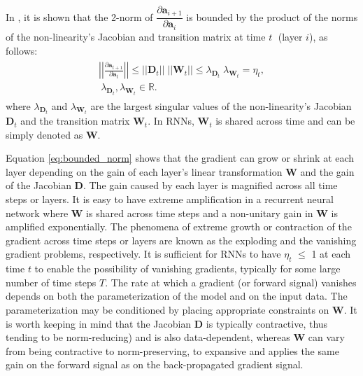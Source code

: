 \documentclass{article} %
\begin{document}
In \citet{pascanu2013difficulty}, it is shown that the 2-norm of ${\mathit{\dfrac{\partial \mathbf{a}_{i+1}}{\partial \mathbf{a}_i}}}$ is bounded by the product of the norms of the non-linearity's Jacobian and transition matrix at time ${\mathit{t\;}}$ (layer ${\mathit{i}}$), as follows:
\begin{equation}\label{eq:bounded_norm}
\begin{aligned}
\begin{gathered}
\left| \left | \frac{\partial \mathbf{a}_{t+1}}{\partial \mathbf{a}_{t}} \right| \right| \leq || \mathbf{D}_t || \; || \mathbf{W}_t || \leq \lambda_{\mathbf{D}_t} \; \lambda_{\mathbf{W}_t} = \eta_t , \\  \ \lambda_{\mathbf{D}_t} , \lambda_{\mathbf{W}_t} \in \mathbb{R}.
\end{gathered}
\end{aligned}
\end{equation}
where $\lambda_{\mathbf{D}_t}$ and $\lambda_{\mathbf{W}_t}$ are the largest singular values of the non-linearity's Jacobian ${\mathit{\mathbf{D}_t}}$ and the transition matrix ${\mathit{\mathbf{W}_t}}$. In RNNs, ${\mathit{\mathbf{W}_t}}$ is shared across time and can be simply denoted as ${\mathit{\mathbf{W}}}$.

Equation \ref{eq:bounded_norm} shows that the gradient can grow or shrink at each layer depending on the gain of each layer's linear transformation ${\mathbf{W}}$ and the gain of the Jacobian ${\mathbf{D}}$. The gain caused by each layer is magnified across all time steps or layers. It is easy to have extreme amplification in a recurrent neural network where ${\mathbf{W}}$ is shared across time steps and a non-unitary gain in ${\mathbf{W}}$ is amplified exponentially. The phenomena of extreme growth or contraction of the gradient across time steps or layers are known as the exploding and the vanishing gradient problems, respectively. It is sufficient for RNNs to have $\eta_t$ $\leq$ 1 at each time $t$ to enable the possibility of vanishing gradients, typically for some large number of time steps ${T}$. The rate at which a gradient (or forward signal) vanishes depends on both the parameterization of the model and on the input data. The parameterization may be conditioned by placing appropriate constraints on ${\mathbf{W}}$. It is worth keeping in mind that the Jacobian ${\mathbf{D}}$ is typically contractive, thus tending to be norm-reducing) and is also data-dependent, whereas ${\mathbf{W}}$ can vary from being contractive to norm-preserving, to expansive and applies the same gain on the forward signal as on the back-propagated gradient signal.
\end{document}
